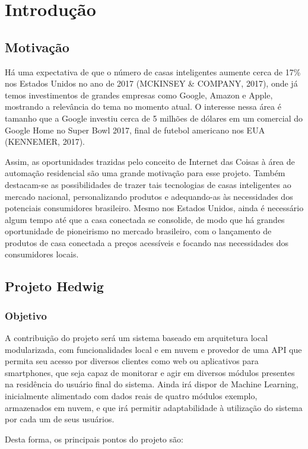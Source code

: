 \chapter{Introdução}

\section{Motivação}
Há uma expectativa de que o número de casas inteligentes aumente cerca de 17\% nos Estados Unidos no ano de 2017 (MCKINSEY \& COMPANY, 2017), onde já temos investimentos de grandes empresas como Google, Amazon e Apple, mostrando a relevância do tema no momento atual. O interesse nessa área é tamanho que a Google investiu cerca de 5 milhões de dólares em um comercial do Google Home no Super Bowl 2017, final de futebol americano nos EUA (KENNEMER, 2017).

Assim, as oportunidades trazidas pelo conceito de Internet das Coisas à área de automação residencial são uma grande motivação para esse projeto. Também destacam-se as possibilidades de trazer tais tecnologias de casas inteligentes ao mercado nacional, personalizando produtos e adequando-as às necessidades dos potenciais consumidores brasileiro. Mesmo nos Estados Unidos, ainda é necessário algum tempo até que a casa conectada se consolide, de modo que há grandes oportunidade de pioneirismo no mercado brasileiro, com o lançamento de produtos de casa conectada a preços acessíveis e focando nas necessidades dos consumidores locais.

\section{Projeto Hedwig}

\subsection{Objetivo}
A contribuição do projeto será um sistema baseado em arquitetura local modularizada, com funcionalidades local e em nuvem e provedor de uma API que permita seu acesso por diversos clientes como web ou aplicativos para smartphones, que seja capaz de monitorar e agir em diversos módulos presentes na residência do usuário final do sistema. Ainda irá dispor de Machine Learning, inicialmente alimentado com dados reais de quatro módulos exemplo, armazenados em nuvem, e que irá permitir adaptabilidade à utilização do sistema por cada um de seus usuários.

Desta forma, os principais pontos do projeto são:

